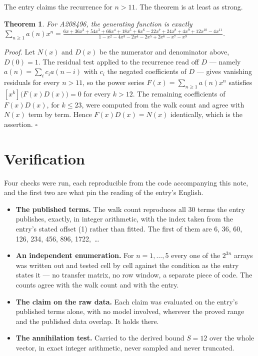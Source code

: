 \documentclass[11pt]{article}
\newtheorem{theorem}{Theorem}
\theoremstyle{definition}
\begin{document}
The entry claims the recurrence for $n > 11$. The theorem is at least as strong.

\begin{theorem} For A208496, the generating function is exactly $\sum_{n\ge 1} a(n)x^n = \frac{6x + 36x^{2} + 54x^{3} + 66x^{4} + 18x^{5} + 6x^{6} - 22x^{7} + 24x^{8} + 4x^{9} + 12x^{10} - 4x^{11}}{1 - x^{2} - 4x^{3} - 2x^{4} - 2x^{5} + 2x^{6} - x^{7} - x^{9}}$.\end{theorem}

{\itshape Proof.} Let $N(x)$ and $D(x)$ be the numerator and denominator above, $D(0)=1$. The residual test applied to the recurrence read off $D$ --- namely $a(n) = \sum_i c_i a(n-i)$ with $c_i$ the negated coefficients of $D$ --- gives vanishing residuals for every $n > 11$, so the power series $F(x)=\sum_{n\ge 1}a(n)x^n$ satisfies $[x^k]\bigl(F(x)D(x)\bigr) = 0$ for every $k > 12$. The remaining coefficients of $F(x)D(x)$, for $k \le 23$, were computed from the walk count and agree with $N(x)$ term by term. Hence $F(x)D(x) = N(x)$ identically, which is the assertion. $\square$

\section{Verification}

Four checks were run, each reproducible from the code accompanying this note, and the first two are what pin the reading of the entry's English.

\begin{itemize}

\item {\bfseries The published terms.} The walk count reproduces all 30 terms the entry publishes, exactly, in integer arithmetic, with the index taken from the entry's stated offset (1) rather than fitted. The first of them are 6, 36, 60, 126, 234, 456, 896, 1722,~\dots

\item {\bfseries An independent enumeration.} For $n = 1,\dots,5$ every one of the $2^{3n}$ arrays was written out and tested cell by cell against the condition as the entry states it --- no transfer matrix, no row window, a separate piece of code. The counts agree with the walk count and with the entry.

\item {\bfseries The claim on the raw data.} Each claim was evaluated on the entry's published terms alone, with no model involved, wherever the proved range and the published data overlap. It holds there.

\item {\bfseries The annihilation test.} Carried to the derived bound $S = 12$ over the whole vector, in exact integer arithmetic, never sampled and never truncated.

\end{itemize}
\end{document}
